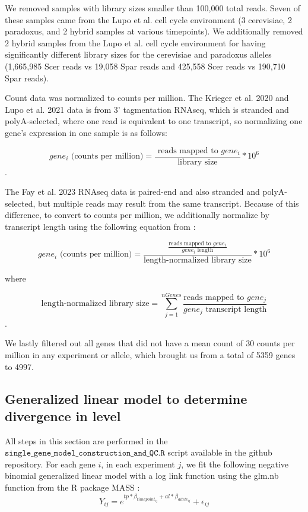 We removed samples with library sizes smaller than 100,000 total reads. Seven of these samples came from the Lupo et al. cell cycle environment (3 cerevisiae, 2 paradoxus, and 2 hybrid samples at various timepoints). We additionally removed 2 hybrid samples from the Lupo et al. cell cycle environment for having significantly different library sizes for the cerevisiae and paradoxus alleles (1,665,985 Scer reads vs 19,058 Spar reads and 425,558 Scer reads vs 190,710 Spar reads).

Count data was normalized to counts per million. The Krieger et al. 2020 and Lupo et al. 2021 data is from 3' tagmentation RNAseq, which is stranded and polyA-selected, where one read is equivalent to one transcript, so normalizing one gene's expression in one sample is as follows:

$$ gene_i \text{ (counts per million)} = \frac{\text{ reads mapped to } gene_i}{\text{library size}}*10^6 $$.

The Fay et al. 2023 RNAseq data is paired-end and also stranded and polyA-selected, but multiple reads may result from the same transcript. Because of this difference, to convert to counts per million, we additionally normalize by transcript length using the following equation from \cite{Zhao2020}:

$$ gene_i\text{ (counts per million)} = \frac{\frac{\text{reads mapped to }gene_i}{gene_i\text{ length}}}{\text{length-normalized library size}}*10^6 $$

where 

$$\text{length-normalized library size} = \sum_{j=1}^{nGenes} \frac{\text{reads mapped to }gene_j}{gene_j\text{ transcript length}}$$.


We lastly filtered out all genes that did not have a mean count of 30 counts per million in any experiment or allele, which brought us from a total of 5359 genes to 4997.

\subsection{Generalized linear model to determine divergence in level}

All steps in this section are performed in the $\texttt{single\_gene\_model\_construction\_and\_QC.R}$ script available in the github repository. For each gene $i$, in each experiment $j$, we fit the following negative binomial generalized linear model with a log link function using the glm.nb function from the R package MASS \cite{MASS}:
$$Y_{ij} = e^{tp*\beta_{timepoint_{ij}} + al*\beta_{allele_{ij}}} + \epsilon_{ij} $$

